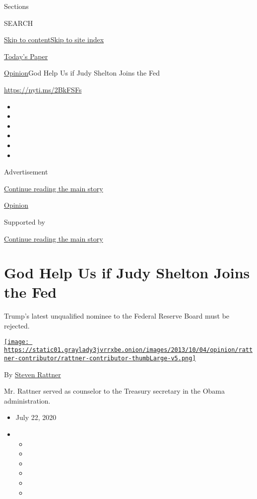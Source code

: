 Sections

SEARCH

\protect\hyperlink{site-content}{Skip to
content}\protect\hyperlink{site-index}{Skip to site index}

\href{https://myaccount.nytimes3xbfgragh.onion/auth/login?response_type=cookie\&client_id=vi}{}

\href{https://www.nytimes3xbfgragh.onion/section/todayspaper}{Today's
Paper}

\href{/section/opinion}{Opinion}\textbar{}God Help Us if Judy Shelton
Joins the Fed

\url{https://nyti.ms/2BkFSFs}

\begin{itemize}
\item
\item
\item
\item
\item
\item
\end{itemize}

Advertisement

\protect\hyperlink{after-top}{Continue reading the main story}

\href{/section/opinion}{Opinion}

Supported by

\protect\hyperlink{after-sponsor}{Continue reading the main story}

\hypertarget{god-help-us-if-judy-shelton-joins-the-fed}{%
\section{God Help Us if Judy Shelton Joins the
Fed}\label{god-help-us-if-judy-shelton-joins-the-fed}}

Trump's latest unqualified nominee to the Federal Reserve Board must be
rejected.

\href{https://www.nytimes3xbfgragh.onion/topic/person/steven-rattner}{\texttt{[image: https://static01.graylady3jvrrxbe.onion/images/2013/10/04/opinion/rattner-contributor/rattner-contributor-thumbLarge-v5.png]}}

By
\href{https://www.nytimes3xbfgragh.onion/topic/person/steven-rattner}{Steven
Rattner}

Mr. Rattner served as counselor to the Treasury secretary in the Obama
administration.

\begin{itemize}
\item
  July 22, 2020
\item
  \begin{itemize}
  \item
  \item
  \item
  \item
  \item
  \item
  \end{itemize}
\end{itemize}

